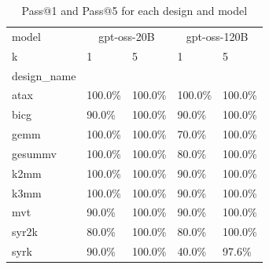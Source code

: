\begin{table}
\caption{Pass@1 and Pass@5 for each design and model}
\label{tab:pass_at_k}
\begin{tabular}{lllll}
\toprule
model & \multicolumn{2}{c}{gpt-oss-20B} & \multicolumn{2}{c}{gpt-oss-120B} \\
k & 1 & 5 & 1 & 5 \\
design_name &  &  &  &  \\
\midrule
atax & 100.0\% & 100.0\% & 100.0\% & 100.0\% \\
bicg & 90.0\% & 100.0\% & 90.0\% & 100.0\% \\
gemm & 100.0\% & 100.0\% & 70.0\% & 100.0\% \\
gesummv & 100.0\% & 100.0\% & 80.0\% & 100.0\% \\
k2mm & 100.0\% & 100.0\% & 90.0\% & 100.0\% \\
k3mm & 100.0\% & 100.0\% & 90.0\% & 100.0\% \\
mvt & 90.0\% & 100.0\% & 90.0\% & 100.0\% \\
syr2k & 80.0\% & 100.0\% & 80.0\% & 100.0\% \\
syrk & 90.0\% & 100.0\% & 40.0\% & 97.6\% \\
\bottomrule
\end{tabular}
\end{table}
